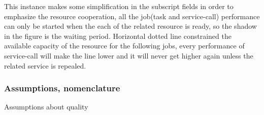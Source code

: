 This instance makes some simplification in the subscript fields in order to emphasize the resource cooperation, all the job(task and service-call) performance can only be started when the each of the related resource is ready, so the shadow in the figure is the waiting period. Horizontal dotted line constrained the available capacity of the resource for the following jobs, every performance of service-call will make the line lower and it will never get higher again unless the related service is repealed.


\subsubsection{Assumptions, nomenclature} %
\label{ssub:assumptions_nomenclature}
Assumptions about quality


